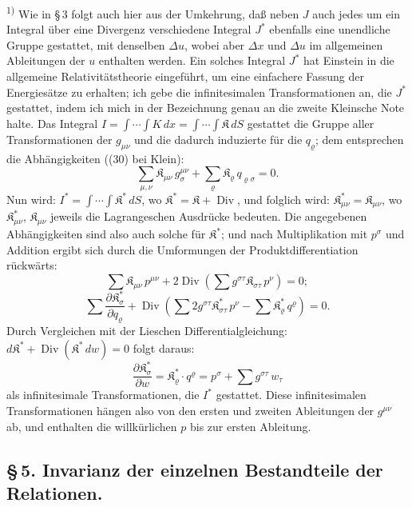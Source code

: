 \documentclass[12pt,a4paper]{article}
\begin{document}
\smallskip
\noindent\textsuperscript{1)} Wie in \S\,3 folgt auch hier aus der Umkehrung, da\ss{} neben $J$ auch jedes um ein Integral \"uber eine Divergenz verschiedene Integral $J^{*}$ ebenfalls eine unendliche Gruppe gestattet, mit denselben $\Delta u$, wobei aber $\Delta x$ und $\Delta u$ im allgemeinen Ableitungen der $u$ enthalten werden. Ein solches Integral $J^{*}$ hat Einstein in die allgemeine Relativit\"atstheorie eingef\"uhrt, um eine einfachere Fassung der Energies\"atze zu erhalten; ich gebe die infinitesimalen Transformationen an, die $J^{*}$ gestattet, indem ich mich in der Bezeichnung genau an die zweite Kleinsche Note halte. Das Integral $I=\int\cdots\int K\,dx=\int\cdots\int\mathfrak{K}\,dS$ gestattet die Gruppe aller Transformationen der $g_{\mu\nu}$ und die dadurch induzierte f\"ur die $q_{\varrho}$; dem entsprechen die Abh\"angigkeiten ((30) bei Klein):
\[
\sum_{\mu,\nu}\mathfrak{K}_{\mu\nu}\,g^{\mu\nu}_{\sigma}+\sum_{\varrho}\mathfrak{K}_{\varrho}\,q_{\varrho\sigma}=0.
\]
Nun wird: $I^{*}=\int\cdots\int\mathfrak{K}^{*}\,dS$, wo $\mathfrak{K}^{*}=\mathfrak{K}+\operatorname{Div}$, und folglich wird: $\mathfrak{K}^{*}_{\mu\nu}=\mathfrak{K}_{\mu\nu}$, wo $\mathfrak{K}^{*}_{\mu\nu}$, $\mathfrak{K}_{\mu\nu}$ jeweils die Lagrangeschen Ausdr\"ucke bedeuten. Die angegebenen Abh\"angigkeiten sind also auch solche f\"ur $\mathfrak{K}^{*}$; und nach Multiplikation mit $p^{\sigma}$ und Addition ergibt sich durch die Umformungen der Produktdifferentiation r\"uckw\"arts:
\[
\sum\mathfrak{K}_{\mu\nu}\,p^{\mu\nu}+2\operatorname{Div}\left(\sum g^{\sigma\tau}\mathfrak{K}_{\sigma\tau}\,p^{\nu}\right)=0;
\]
\[
\sum\frac{\partial\mathfrak{K}^{*}_{\sigma}}{\partial q_{\varrho}}+\operatorname{Div}\left(\sum 2g^{\sigma\tau}\mathfrak{K}^{*}_{\sigma\tau}\,p^{\nu}-\sum\mathfrak{K}^{*}_{\varrho}\,q^{\varrho}\right)=0.
\]
Durch Vergleichen mit der Lieschen Differentialgleichung: $d\mathfrak{K}^{*}+\operatorname{Div}(\mathfrak{K}^{*}\,dw)=0$ folgt daraus:
\[
\frac{\partial\mathfrak{K}^{*}_{\sigma}}{\partial w}=\mathfrak{K}^{*}_{\varrho}\cdot q^{\varrho}=p^{\sigma}+\sum g^{\sigma\tau}\,w_{\tau}
\]
als infinitesimale Transformationen, die $I^{*}$ gestattet. Diese infinitesimalen Transformationen h\"angen also von den ersten und zweiten Ableitungen der $g^{\mu\nu}$ ab, und enthalten die willk\"urlichen $p$ bis zur ersten Ableitung.

\subsection*{\S\,5. Invarianz der einzelnen Bestandteile der Relationen.}
\end{document}
